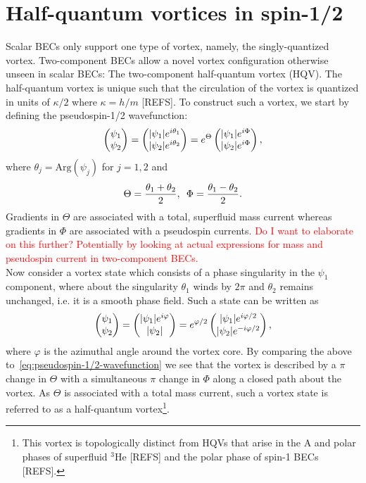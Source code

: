 \section{Half-quantum vortices in spin-1/2}
Scalar BECs only support one type of vortex, namely, the singly-quantized
vortex.
Two-component BECs allow a novel vortex configuration otherwise unseen in
scalar BECs: The two-component half-quantum 
vortex (HQV).
The half-quantum vortex is unique such that the circulation of the vortex is
quantized in units of $\kappa / 2$ where $\kappa=h/m$ [REFS].
To construct such a vortex, we start by defining the pseudospin-1/2
wavefunction:
\begin{equation}
    \begin{pmatrix}\psi_1\\\psi_2\end{pmatrix} 
    = \begin{pmatrix}|\psi_1|e^{i\theta_1}\\|\psi_2|e^{i\theta_2}\end{pmatrix}
    = e^{\Theta}\begin{pmatrix}|\psi_1|e^{i\Phi}\\|\psi_2|e^{i\Phi}\end{pmatrix},
    \label{eq:pseudospin-1/2-wavefunction}
\end{equation}
where $\theta_j=\mathrm{Arg}(\psi_j)$ for $j=1,2$ and
\begin{equation}
    \Theta = \frac{\theta_1 + \theta_2}{2}, \enskip 
    \Phi = \frac{\theta_1 - \theta_2}{2}.
\end{equation}
Gradients in $\Theta$ are associated with a total, superfluid mass current
whereas gradients in $\Phi$ are associated with a pseudospin currents.
\textcolor{red}{Do I want to elaborate on this further? Potentially by looking
at actual expressions for mass and pseudospin current in two-component BECs.} \\
Now consider a vortex state which consists of a phase singularity in the $\psi_1$
component, where about the singularity $\theta_1$ winds by $2\pi$ and $\theta_2$
remains unchanged, i.e. it is a smooth phase field.
Such a state can be written as
\begin{equation}
    \begin{pmatrix}\psi_1\\\psi_2\end{pmatrix} 
    = \begin{pmatrix}|\psi_1|e^{i\varphi}\\|\psi_2|\end{pmatrix}
    = e^{\varphi/2}\begin{pmatrix}|\psi_1|e^{i\varphi/2}\\|\psi_2|e^{-i\varphi/2}\end{pmatrix},
\end{equation}
where $\varphi$ is the azimuthal angle around the vortex core.
By comparing the above to~\eqref{eq:pseudospin-1/2-wavefunction} we see that
the vortex is described by a $\pi$ change in $\Theta$ with a simultaneous $\pi$
change in $\Phi$ along a closed path about the vortex.
As $\Theta$ is associated with a total mass current, such a vortex state is
referred to as a half-quantum vortex\footnote{This vortex is topologically
distinct from HQVs that arise in the A and polar phases of superfluid $^3$He
[REFS] and the polar phase of spin-1 BECs [REFS].}.
\par

